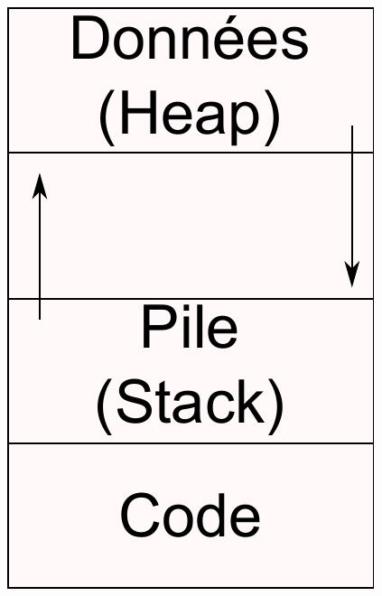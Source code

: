 \begin{frame}{\sectitle}
\begin{columns}[c]
\includegraphics[width=\textwidth]{images/Workspace.pdf}
\end{columns}
\end{frame}

\def\subsectitle{La zone u(tilisateur)}
